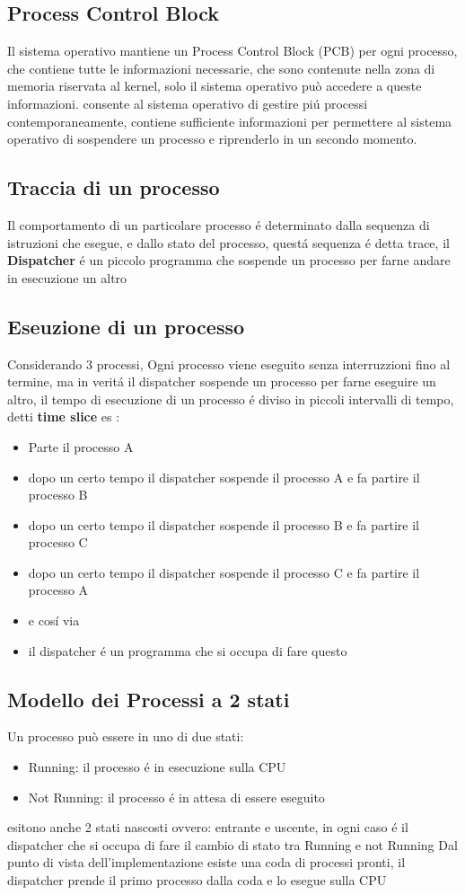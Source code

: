 \documentclass[11pt]{article}
\begin{document}
\subsection{Process Control Block}
Il sistema operativo mantiene un Process Control Block (PCB) per ogni processo, che contiene tutte le informazioni necessarie,
che sono contenute nella zona di memoria riservata al kernel, solo il sistema operativo può accedere a queste informazioni.
consente al sistema operativo di gestire piú processi contemporaneamente, contiene sufficiente informazioni per permettere
al sistema operativo di sospendere un processo e riprenderlo in un secondo momento.
\subsection{Traccia di un processo}
Il comportamento di un particolare processo é determinato dalla sequenza di istruzioni che esegue, e dallo stato del processo,
questá sequenza é detta trace, il \textbf{Dispatcher} é un piccolo programma che sospende un processo per farne andare in esecuzione un altro
\subsection{Eseuzione di un processo}
Considerando 3 processi, Ogni processo viene eseguito senza interruzzioni fino al termine, ma in veritá il dispatcher
sospende un processo per farne eseguire un altro, il tempo di esecuzione di un processo é diviso in piccoli intervalli
di tempo, detti \textbf{time slice} es :
\begin{itemize}
    \item Parte il processo A
    \item dopo un certo tempo il dispatcher sospende il processo A e fa partire il processo B
    \item dopo un certo tempo il dispatcher sospende il processo B e fa partire il processo C
    \item dopo un certo tempo il dispatcher sospende il processo C e fa partire il processo A
    \item e cosí via
    \item il dispatcher é un programma che si occupa di fare questo
\end{itemize}
\subsection{Modello dei Processi a 2 stati}
Un processo può essere in uno di due stati:
\begin{itemize}
    \item Running: il processo é in esecuzione sulla CPU
    \item Not Running: il processo é in attesa di essere eseguito
\end{itemize}
esitono anche 2 stati nascosti ovvero: entrante e uscente, in ogni caso é il dispatcher che si occupa di fare il cambio di stato tra Running e not Running
Dal punto di vista dell'implementazione esiste una coda di processi pronti, il dispatcher prende il primo processo dalla coda e lo esegue sulla CPU
\end{document}
